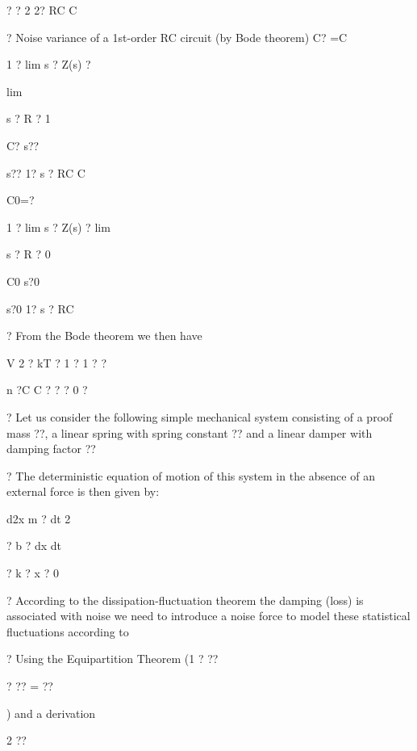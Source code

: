 \documentclass[2pt,landscape]{article}
\begin{document}
\begin{multicols*}{5}
?	?
2	2? RC	C



?	Noise variance of a 1st-order RC circuit (by Bode theorem)
C? =C



1 ? lim s ? Z(s) ?



lim


s ? R	? 1



C?	s??


s?? 1? s ? RC	C








C0=?



1 ? lim s ? 
Z(s) ? lim




s ? R	? 0


C0	s?0


s?0 1? s ? RC



?	From the Bode theorem we then have



V 2 ? kT ? 1 ? 1 ? ?

n	?C	C ?
?	?	0 ?



?	Let us consider the following simple mechanical system consisting of a 
proof mass ??, a linear spring with spring constant ?? and a linear 
damper with damping factor ??


?	The deterministic equation of motion of this 
system in the absence of an external force 
is then given by:



d2x  
m ? dt 2


?	b ? dx
dt


? k ? x ? 0



?	According to the dissipation-fluctuation
theorem the damping (loss) is associated with noise
we need to introduce a noise force to model these statistical 
fluctuations according to






?	Using the Equipartition Theorem (1 ? ??



? ?? = ??


) and a derivation


2	??



\end{multicols*}
\end{document}
